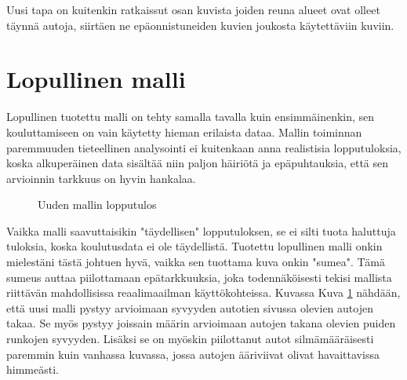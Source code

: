 Uusi tapa on kuitenkin ratkaissut osan kuvista joiden reuna alueet ovat olleet täynnä autoja, siirtäen ne epäonnistuneiden kuvien joukosta käytettäviin kuviin.

\section{Lopullinen malli}

Lopullinen tuotettu malli on tehty samalla tavalla kuin ensimmäinenkin, 
sen kouluttamiseen on vain käytetty hieman erilaista dataa.
Mallin toiminnan paremmuuden tieteellinen analysointi ei kuitenkaan anna realistisia lopputuloksia, 
koska alkuperäinen data sisältää niin paljon häiriötä ja epäpuhtauksia, että sen arvioinnin tarkkuus on hyvin hankalaa.

\begin{figure}[h]
\centering
{}
\caption{Uuden mallin lopputulos}
\label{fig:uusi_malli}
\end{figure}


Vaikka malli saavuttaisikin "täydellisen" lopputuloksen, se ei silti tuota haluttuja tuloksia, koska koulutusdata ei ole täydellistä.
Tuotettu lopullinen malli onkin mielestäni tästä johtuen hyvä, vaikka sen tuottama kuva onkin "sumea". 
Tämä sumeus auttaa piilottamaan epätarkkuuksia, joka todennäköisesti tekisi mallista riittävän mahdollisissa reaalimaailman käyttökohteissa.
Kuvassa Kuva \ref{fig:uusi_malli} nähdään, että uusi malli pystyy arvioimaan syvyyden autotien sivussa olevien autojen takaa. 
Se myös pystyy joissain määrin arvioimaan autojen takana olevien puiden runkojen syvyyden. 
Lisäksi se on myöskin piilottanut autot silmämääräisesti paremmin kuin vanhassa kuvassa, jossa autojen ääriviivat olivat havaittavissa himmeästi.
